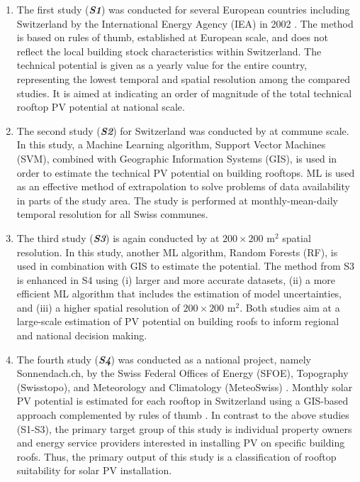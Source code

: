 \begin{enumerate}
\item The first study (\textit{\textbf{S1}}) was conducted for several European countries including Switzerland by the International Energy Agency (IEA) in 2002 \cite{iea_potential_2002}. The method is based on rules of thumb, established at European scale, and does not reflect the local building stock characteristics within Switzerland. The technical potential is given as a yearly value for the entire country, representing the lowest temporal and spatial resolution among the compared studies. It is aimed at indicating an order of magnitude of the total technical rooftop PV potential at national scale. 
\item The second study (\textit{\textbf{S2}}) for Switzerland was conducted by \citet{assouline_quantifying_2017} at commune scale. In this study, a Machine Learning algorithm, Support Vector Machines (SVM), combined with Geographic Information Systems (GIS), is used in order to estimate the technical PV potential on building rooftops. ML is used as an effective method of extrapolation to solve problems of data availability in parts of the study area. The study is performed at monthly-mean-daily temporal resolution for all Swiss communes. 
\item The third study (\textit{\textbf{S3}}) is again conducted by \citet{assouline_large-scale_2018} at $200 \times 200$ m$^2$ spatial resolution. In this study, another ML algorithm, Random Forests (RF), is used in combination with GIS to estimate the potential. The method from S3 is enhanced in S4 using (i) larger and more accurate datasets, (ii) a more efficient  ML algorithm that includes the estimation of model uncertainties, and (iii) a higher spatial resolution of $200 \times 200$ m$^2$. Both studies aim at a large-scale estimation of PV potential on building roofs to inform regional and national decision making.
\item The fourth study (\textbf{\textit{S4}}) was conducted as a national project, namely Sonnendach.ch, by the Swiss Federal Offices of Energy (SFOE), Topography (Swisstopo), and Meteorology and Climatology (MeteoSwiss) \cite{klauser_solarpotentialanalyse_2016,portmann_sonnendach.ch:_2016}. Monthly solar PV potential is estimated for each rooftop in Switzerland using a GIS-based approach \cite{klauser_solarpotentialanalyse_2016} complemented by rules of thumb \cite{portmann_sonnendach.ch:_2016}. In contrast to the above studies (S1-S3), the primary target group of this study is individual property owners and energy service providers interested in installing PV on specific building roofs. Thus, the primary output of this study is a classification of rooftop suitability for solar PV installation.

\end{enumerate}

